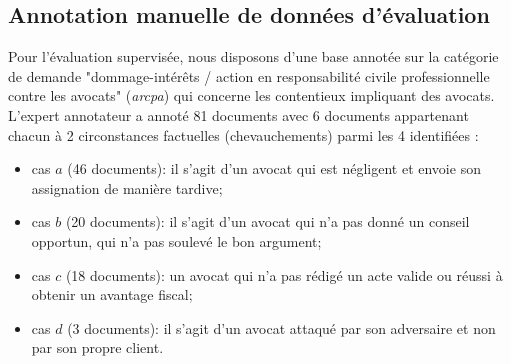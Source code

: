 \subsection{Annotation manuelle de données d'évaluation}
Pour l'évaluation supervisée, nous disposons d'une base annotée sur la catégorie de demande "dommage-intérêts / action en responsabilité civile professionnelle contre les avocats" (\textit{arcpa}) qui concerne les contentieux impliquant des avocats.  L'expert annotateur a annoté 81 documents avec 6 documents appartenant chacun à 2 circonstances factuelles (chevauchements) parmi les 4 identifiées :
\begin{itemize}
\item cas $a$ (46 documents): il s'agit d'un avocat qui est négligent et envoie son assignation de manière tardive; %
\item cas $b$ (20 documents): il s'agit d'un avocat qui n'a pas donné un conseil opportun, qui n'a pas soulevé le bon argument;
\item cas $c$ (18 documents): un avocat qui n'a pas rédigé un acte valide ou réussi à obtenir un avantage fiscal; %
\item cas $d$ (3 documents): il s'agit d'un avocat attaqué par son adversaire et non par son propre client.
\end{itemize}



